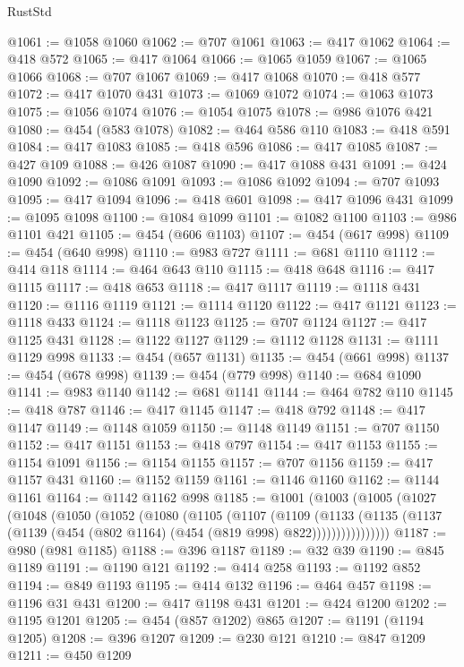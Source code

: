 \begin{lexlean}{RustStd}
\begin{coremodule}
{\begin{coremodule}
{{{{{{{{{{{{{{{{{{{{{{{{{{{{{{{{@1061 := @1058 @1060
@1062 := @707 @1061
@1063 := @417 @1062
@1064 := @418 @572
@1065 := @417 @1064
@1066 := @1065 @1059
@1067 := @1065 @1066
@1068 := @707 @1067
@1069 := @417 @1068
@1070 := @418 @577
@1072 := @417 @1070 @431
@1073 := @1069 @1072
@1074 := @1063 @1073
@1075 := @1056 @1074
@1076 := @1054 @1075
@1078 := @986 @1076 @421
@1080 := @454 (@583 @1078)
@1082 := @464 @586 @110
@1083 := @418 @591
@1084 := @417 @1083
@1085 := @418 @596
@1086 := @417 @1085
@1087 := @427 @109
@1088 := @426 @1087
@1090 := @417 @1088 @431
@1091 := @424 @1090
@1092 := @1086 @1091
@1093 := @1086 @1092
@1094 := @707 @1093
@1095 := @417 @1094
@1096 := @418 @601
@1098 := @417 @1096 @431
@1099 := @1095 @1098
@1100 := @1084 @1099
@1101 := @1082 @1100
@1103 := @986 @1101 @421
@1105 := @454 (@606 @1103)
@1107 := @454 (@617 @998)
@1109 := @454 (@640 @998)
@1110 := @983 @727
@1111 := @681 @1110
@1112 := @414 @118
@1114 := @464 @643 @110
@1115 := @418 @648
@1116 := @417 @1115
@1117 := @418 @653
@1118 := @417 @1117
@1119 := @1118 @431
@1120 := @1116 @1119
@1121 := @1114 @1120
@1122 := @417 @1121
@1123 := @1118 @433
@1124 := @1118 @1123
@1125 := @707 @1124
@1127 := @417 @1125 @431
@1128 := @1122 @1127
@1129 := @1112 @1128
@1131 := @1111 @1129 @998
@1133 := @454 (@657 @1131)
@1135 := @454 (@661 @998)
@1137 := @454 (@678 @998)
@1139 := @454 (@779 @998)
@1140 := @684 @1090
@1141 := @983 @1140
@1142 := @681 @1141
@1144 := @464 @782 @110
@1145 := @418 @787
@1146 := @417 @1145
@1147 := @418 @792
@1148 := @417 @1147
@1149 := @1148 @1059
@1150 := @1148 @1149
@1151 := @707 @1150
@1152 := @417 @1151
@1153 := @418 @797
@1154 := @417 @1153
@1155 := @1154 @1091
@1156 := @1154 @1155
@1157 := @707 @1156
@1159 := @417 @1157 @431
@1160 := @1152 @1159
@1161 := @1146 @1160
@1162 := @1144 @1161
@1164 := @1142 @1162 @998
@1185 := @1001
    (@1003
      (@1005
        (@1027
          (@1048
            (@1050
              (@1052
                (@1080
                  (@1105
                    (@1107
                      (@1109
                        (@1133
                          (@1135
                            (@1137 (@1139 (@454 (@802 @1164) (@454 (@819 @998) @822))))))))))))))))
@1187 := @980 (@981 @1185)
@1188 := @396 @1187
@1189 := @32 @39
@1190 := @845 @1189
@1191 := @1190 @121
@1192 := @414 @258
@1193 := @1192 @852
@1194 := @849 @1193
@1195 := @414 @132
@1196 := @464 @457
@1198 := @1196 @31 @431
@1200 := @417 @1198 @431
@1201 := @424 @1200
@1202 := @1195 @1201
@1205 := @454 (@857 @1202) @865
@1207 := @1191 (@1194 @1205)
@1208 := @396 @1207
@1209 := @230 @121
@1210 := @847 @1209
@1211 := @450 @1209
}}}}}}}}}}}}}}}}}}}}}}}}}}}}}}}}
\end{coremodule}}
\end{coremodule}
\end{lexlean}
